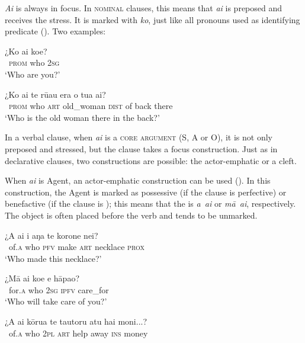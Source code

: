 \textit{Ai} is always in focus. In \textsc{nominal} clauses, this means that \textit{ai} is preposed and receives the  stress. It is marked with \textit{ko}, just like all pronouns used as identifying predicate (). Two examples:

\ea\label{ex:10.28}
\gll ¿Ko ai koe? \\
~\textsc{prom} who \textsc{2sg} \\

\glt 
‘Who are you?’ \textstyleExampleref{[R304.097]} 
\z

\ea\label{ex:10.29}
\gll ¿Ko ai te rū{\ꞌ}au era o tu{\ꞌ}a {\ꞌ}ai? \\
~\textsc{prom} who \textsc{art} old\_woman \textsc{dist} of back there \\

\glt 
‘Who is the old woman there in the back?’ \textstyleExampleref{[R416.1092]}
\z

In a verbal clause, when \textit{ai} is a \textsc{core argument} (S, A or O), it is not only preposed and stressed, but the clause takes a focus construction. Just as in declarative clauses, two constructions are possible: the actor-emphatic or a cleft.

When \textit{ai} is Agent, an actor-emphatic construction can be used (). In this construction, the Agent is marked as possessive (if the clause is perfective) or benefactive (if the clause is ); this means that the  is \textit{{\ꞌ}a~{\ꞌ}ai} or \textit{mā~{\ꞌ}ai}, respectively. The object is often placed before the verb and tends to be unmarked.

\ea\label{ex:10.30}
\gll ¿{\ꞌ}A {\ꞌ}ai i aŋa te korone nei? \\
~of\textsc{.a} who \textsc{pfv} make \textsc{art} necklace \textsc{prox} \\

\glt 
‘Who made this necklace?’ \textstyleExampleref{[R208.263]} 
\z

\ea\label{ex:10.31}
\gll ¿Mā {\ꞌ}ai koe e hāpa{\ꞌ}o? \\
~for\textsc{.a} who \textsc{2sg} \textsc{ipfv} care\_for \\

\glt 
‘Who will take care of you?’ \textstyleExampleref{[R438.011]} 
\z

\ea\label{ex:10.32}
\gll ¿{\ꞌ}A {\ꞌ}ai kōrua te tautoru atu hai moni...? \\
~of\textsc{.a} who \textsc{2pl} \textsc{art} help away \textsc{ins} money \\

